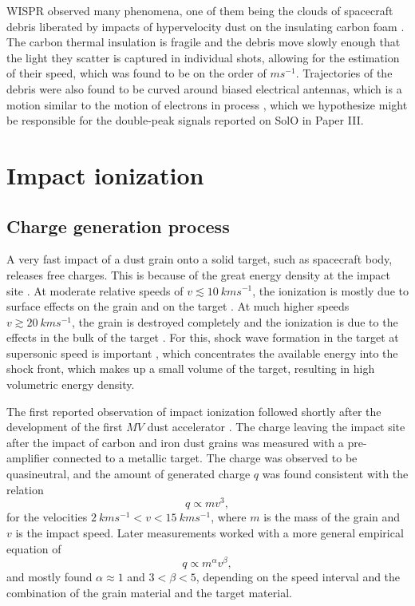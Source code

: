WISPR observed many phenomena, one of them being the clouds of spacecraft debris liberated by impacts of hypervelocity dust on the insulating carbon foam \citep{malaspina2022clouds}. The carbon thermal insulation is fragile and the debris move slowly enough that the light they scatter is captured in individual shots, allowing for the estimation of their speed, which was found to be on the order of $\si{m s^{-1}}$. Trajectories of the debris were also found to be curved around biased electrical antennas, which is a motion similar to the motion of electrons in \citeauthor{pantellini2012nano} process \citep{pantellini2012nano}, which we hypothesize might be responsible for the double-peak signals reported on SolO in Paper III. 


\section{Impact ionization}

\subsection{Charge generation process}

A very fast impact of a dust grain onto a solid target, such as spacecraft body, releases free charges. This is because of the great energy density at the impact site \citep{shen2021cosmic}. At moderate relative speeds of $v \lesssim \SI{10}{kms^{-1}}$, the ionization is mostly due to surface effects on the grain and on the target \citep{kissel1987ion}. At much higher speeds $v \gtrsim \SI{20}{kms^{-1}}$, the grain is destroyed completely and the ionization is due to the effects in the bulk of the target \citep{hornung1994shock}. For this, shock wave formation in the target at supersonic speed is important \citep{drapatz1974theory}, which concentrates the available energy into the shock front, which makes up a small volume of the target, resulting in high volumetric energy density. 

The first reported observation \citep{friichtenicht1964} of impact ionization followed shortly after the development of the first $MV$ dust accelerator \citep{friichtenicht1962}. The charge leaving the impact site after the impact of carbon and iron dust grains was measured with a pre-amplifier connected to a metallic target. The charge was observed to be quasineutral, and the amount of generated charge $q$ was found consistent with the relation
\begin{equation}
    q \propto m v^3,
\end{equation}
for the velocities  $\SI{2}{kms^{-1}} < v < \SI{15}{kms^{-1}}$, where $m$ is the mass of the grain and $v$ is the impact speed. Later measurements \citep{auer1968,mcbride1999meteoroid,grun1984impact,collette2014micrometeoroid,shen2021cosmic} worked with a more general empirical equation of 
\begin{equation}
    q \propto m^\alpha v^\beta, \label{eq:charge_generation}
\end{equation}
and mostly found $\alpha \approx 1$ and $3 < \beta < 5$, depending on the speed interval and the combination of the grain material and the target material.

